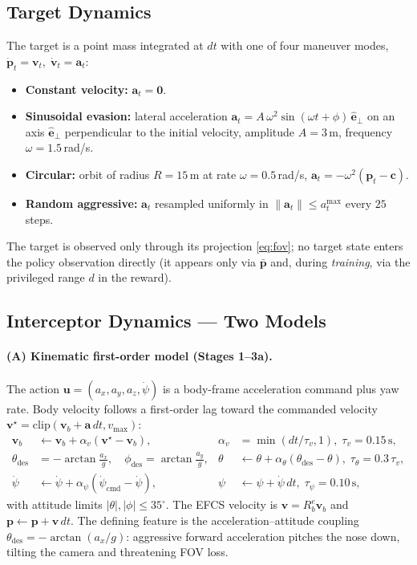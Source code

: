 \documentclass[11pt]{article}
\begin{document}
\subsection{Target Dynamics}
\label{sec:target}
The target is a point mass integrated at $dt$ with one of four maneuver modes,
$\dot{\mathbf p}_t=\mathbf v_t,\;\dot{\mathbf v}_t=\mathbf a_t$:
\begin{itemize}[nosep]
\item \textbf{Constant velocity:} $\mathbf a_t=\mathbf 0$.
\item \textbf{Sinusoidal evasion:} lateral acceleration
$\mathbf a_t=A\,\omega^2\sin(\omega t+\phi)\,\hat{\mathbf e}_\perp$ on an axis
$\hat{\mathbf e}_\perp$ perpendicular to the initial velocity, amplitude
$A=3\,$m, frequency $\omega=1.5\,$rad/s.
\item \textbf{Circular:} orbit of radius $R=15\,$m at rate $\omega=0.5\,$rad/s,
$\mathbf a_t=-\omega^2(\mathbf p_t-\mathbf c)$.
\item \textbf{Random aggressive:} $\mathbf a_t$ resampled uniformly in
$\lVert\mathbf a_t\rVert\le a_t^{\max}$ every $25$ steps.
\end{itemize}
The target is observed only through its projection \eqref{eq:fov}; no target
state enters the policy observation directly (it appears only via $\bar{\mathbf p}$
and, during \emph{training}, via the privileged range $d$ in the reward).

\subsection{Interceptor Dynamics --- Two Models}
\label{sec:dyn}
\paragraph{(A) Kinematic first-order model (Stages 1--3a).}
The action $\mathbf u=(a_x,a_y,a_z,\dot\psi)$ is a body-frame acceleration
command plus yaw rate. Body velocity follows a first-order lag toward the
commanded velocity $\mathbf v^\star=\mathrm{clip}(\mathbf v_b+\mathbf a\,dt,
v_{\max})$:
\begin{align}
\mathbf v_b &\leftarrow \mathbf v_b+\alpha_v(\mathbf v^\star-\mathbf v_b),
&\alpha_v&=\min(dt/\tau_v,1),\;\tau_v=0.15\,\text{s},\\
\theta_\text{des}&=-\arctan\!\tfrac{a_x}{g},\quad
\phi_\text{des}=\arctan\!\tfrac{a_y}{g}, &
\theta&\leftarrow\theta+\alpha_\theta(\theta_\text{des}-\theta),\;
\tau_\theta=0.3\,\tau_v,\\
\dot\psi&\leftarrow\dot\psi+\alpha_\psi(\dot\psi_\text{cmd}-\dot\psi),&
\psi&\leftarrow\psi+\dot\psi\,dt,\;\tau_\psi=0.10\,\text{s},
\end{align}
with attitude limits $|\theta|,|\phi|\le35^\circ$. The EFCS velocity is
$\mathbf v=R_b^e\mathbf v_b$ and $\mathbf p\leftarrow\mathbf p+\mathbf v\,dt$.
The defining feature is the acceleration--attitude coupling
$\theta_\text{des}=-\arctan(a_x/g)$: aggressive forward acceleration pitches
the nose down, tilting the camera and threatening FOV loss.
\end{document}
